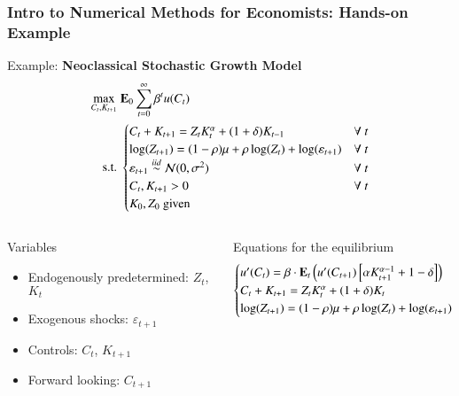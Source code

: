 \documentclass[10pt, aspectratio=1610, handout]{beamer}
\begin{document}
  \begin{frame}
    \frametitle{Intro to Numerical Methods for Economists: Hands-on Example}

    Example: \textbf{Neoclassical Stochastic Growth Model}
    \begin{align*}
      \max_{C_t, K_{t+1}} &\; \mathbf{E}_0 \sum_{t=0}^{\infty} \beta^t u(C_t) \\
      \text{s.t.} &\; \begin{cases}
        C_t + K_{t+1} = Z_t K_t^\alpha + (1 + \delta) K_{t-1} &\forall\ t\\
        \log(Z_{t+1}) = (1-\rho) \mu + \rho \log(Z_t) + \log(\varepsilon_{t+1}) &\forall\ t\\
        \varepsilon_{t+1} \overset{iid}{\sim} \mathcal{N}(0, \sigma^2) &\forall\ t\\
        C_t, K_{t+1} > 0 &\forall\ t\\
        K_{0}, Z_{0} \text{ given}
      \end{cases}
    \end{align*}

    \vfill\pause

    \begin{columns}[T]
      \begin{column}{0.475\textwidth}
        Variables
        \begin{itemize}
          \item Endogenously predetermined: $Z_t$, $K_t$
          \item Exogenous shocks: $\varepsilon_{t+1}$
          \item Controls: $C_t$, $K_{t+1}$
          \item Forward looking: $C_{t+1}$
        \end{itemize}
      \end{column}
      \begin{column}{0.475\textwidth}
        Equations for the equilibrium
        \begin{equation*}
          \begin{cases}
            u'(C_t) = \beta \cdot \mathbf{E}_t \left( u'(C_{t+1}) \left[ \alpha K_{t+1}^{\alpha-1} + 1 - \delta \right] \right) \\
            C_t + K_{t+1} = Z_t K_t^\alpha + (1 + \delta) K_t  \\
            \log(Z_{t+1}) = (1-\rho) \mu + \rho \log(Z_t) + \log(\varepsilon_{t+1})
          \end{cases}
        \end{equation*}
      \end{column}
    \end{columns}

  \end{frame}
\end{document}
